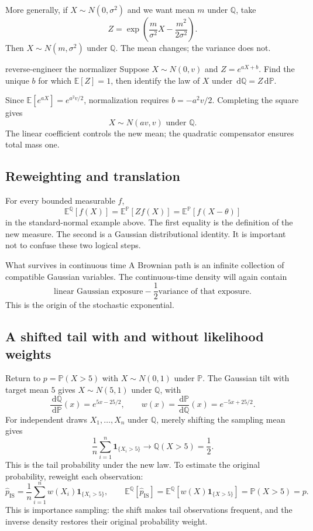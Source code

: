 \documentclass[10pt]{article}
\newcommand{\E}{\mathbb E}
\newcommand{\Pp}{\mathbb P}
\newcommand{\Q}{\mathbb Q}
\newcommand{\1}{\mathbf 1}
\newcommand{\dd}{\,\mathrm d}
\theoremstyle{definition}
\begin{document}
More generally, if \(X\sim N(0,\sigma^2)\) and we want mean \(m\) under
\(\Q\), take
\[
\boxed{
Z=\exp\!\left(\frac{m}{\sigma^2}X
-\frac{m^2}{2\sigma^2}\right).}
\]
Then \(X\sim N(m,\sigma^2)\) under \(\Q\). The mean changes; the variance
does not.

\begin{studentexercise}{reverse-engineer the normalizer}
Suppose \(X\sim N(0,v)\) and \(Z=e^{aX+b}\). Find the unique \(b\) for which
\(\E[Z]=1\), then identify the law of \(X\) under \(\dd\Q=Z\dd\Pp\).
\end{studentexercise}
\begin{shortsolution}
Since \(\E[e^{aX}]=e^{a^2v/2}\), normalization requires
\(b=-a^2v/2\). Completing the square gives
\[
\boxed{X\sim N(av,v)\text{ under }\Q.}
\]
The linear coefficient controls the new mean; the quadratic compensator
ensures total mass one.
\end{shortsolution}

\subsection{Reweighting and translation}

For every bounded measurable \(f\),
\[
\boxed{
\E^{\Q}[f(X)]
=\E^{\Pp}[Zf(X)]
=\E^{\Pp}[f(X-\theta)]}
\]
in the standard-normal example above. The first equality is the definition
of the new measure. The second is a Gaussian distributional identity. It is
important not to confuse these two logical steps.

\begin{keyidea}{What survives in continuous time}
A Brownian path is an infinite collection of compatible Gaussian variables.
The continuous-time density will again contain
\[
\text{linear Gaussian exposure}
-\frac12\text{variance of that exposure}.
\]
This is the origin of the stochastic exponential.
\end{keyidea}

\subsection{A shifted tail with and without likelihood weights}

Return to \(p=\Pp(X>5)\) with \(X\sim N(0,1)\) under \(\Pp\). The Gaussian
tilt with target mean \(5\) gives \(X\sim N(5,1)\) under \(\Q\), with
\[
\frac{\dd\Q}{\dd\Pp}(x)=e^{5x-25/2},
\qquad
w(x)=\frac{\dd\Pp}{\dd\Q}(x)=e^{-5x+25/2}.
\]
For independent draws \(X_1,\ldots,X_n\) under \(\Q\), merely shifting
the sampling mean gives
\[
\frac1n\sum_{i=1}^n\1_{\{X_i>5\}}
\longrightarrow\Q(X>5)=\frac12.
\]
This is the tail probability under the new law. To estimate the original
probability, reweight each observation:
\[
\boxed{
\widehat p_{\mathrm{IS}}
=\frac1n\sum_{i=1}^n w(X_i)\1_{\{X_i>5\}},
\qquad
\E^{\Q}[\widehat p_{\mathrm{IS}}]
=\E^{\Q}[w(X)\1_{\{X>5\}}]
=\Pp(X>5)=p.}
\]
This is importance sampling: the shift makes tail observations frequent,
and the inverse density restores their original probability weight.
\end{document}
